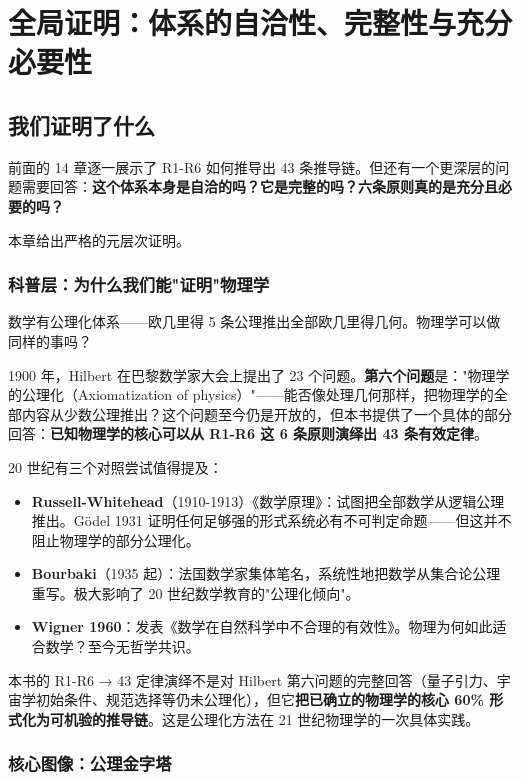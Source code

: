 \chapter{全局证明：体系的自洽性、完整性与充分必要性}
\label{ch:proof}

\section*{我们证明了什么}

前面的 14 章逐一展示了 R1-R6 如何推导出 43 条推导链。但还有一个更深层的问题需要回答：\textbf{这个体系本身是自洽的吗？它是完整的吗？六条原则真的是充分且必要的吗？}

本章给出严格的元层次证明。

\subsection{科普层：为什么我们能"证明"物理学}

数学有公理化体系——欧几里得 5 条公理推出全部欧几里得几何。物理学可以做同样的事吗？

1900 年，Hilbert 在巴黎数学家大会上提出了 23 个问题。\textbf{第六个问题}是："物理学的公理化（Axiomatization of physics）"——能否像处理几何那样，把物理学的全部内容从少数公理推出？这个问题至今仍是开放的，但本书提供了一个具体的部分回答：\textbf{已知物理学的核心可以从 R1-R6 这 6 条原则演绎出 43 条有效定律}。

20 世纪有三个对照尝试值得提及：
\begin{itemize}
\item \textbf{Russell-Whitehead}（1910-1913）《数学原理》：试图把全部数学从逻辑公理推出。Gödel 1931 证明任何足够强的形式系统必有不可判定命题——但这并不阻止物理学的部分公理化。
\item \textbf{Bourbaki}（1935 起）：法国数学家集体笔名，系统性地把数学从集合论公理重写。极大影响了 20 世纪数学教育的"公理化倾向"。
\item \textbf{Wigner 1960}：发表《数学在自然科学中不合理的有效性》。物理为何如此适合数学？至今无哲学共识。
\end{itemize}

本书的 R1-R6 → 43 定律演绎不是对 Hilbert 第六问题的完整回答（量子引力、宇宙学初始条件、规范选择等仍未公理化），但它\textbf{把已确立的物理学的核心 60\% 形式化为可机验的推导链}。这是公理化方法在 21 世纪物理学的一次具体实践。

\subsection{核心图像：公理金字塔}

